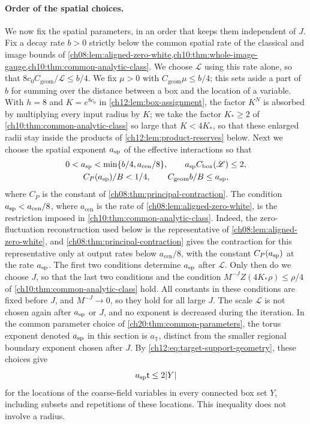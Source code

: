 \paragraph{Order of the spatial choices.}
We now fix the spatial parameters, in an order that keeps them independent of $J$. Fix a decay rate $b>0$ strictly below the common spatial rate of the classical and image bounds of \cref{ch08:lem:aligned-zero-white,ch10:thm:whole-image-gauge,ch10:thm:common-analytic-class}. We choose $\mathscr L$ using this rate alone, so that $8c_0C_{\mathrm{geom}}/\mathscr L\le b/4$. We fix $\mu>0$ with $C_{\mathrm{geom}}\mu\le b/4$; this sets aside a part of $b$ for summing over the distance between a box and the location of a variable. With $h=8$ and $K=e^{8c_0}$ in \cref{ch12:lem:box-assignment}, the factor $K^N$ is absorbed by multiplying every input radius by $K$; we take the factor $K_*\ge2$ of \cref{ch10:thm:common-analytic-class} so large that $K<4K_*$, so that these enlarged radii stay inside the products of \cref{ch12:lem:product-reserves} below. Next we choose the spatial exponent $a_{\mathrm{sp}}$ of the effective interactions so that
\begin{equation}\label{ch12:eq:pre-J-spatial-gates}
 \begin{gathered}
 0<a_{\mathrm{sp}}<\min\{b/4,a_{\mathrm{cen}}/8\},\qquad
 a_{\mathrm{sp}} C_{\mathrm{box}}(\mathscr L)\le2,\\
 C_P(a_{\mathrm{sp}})/B<1/4,\qquad
 C_{\mathrm{geom}}b/B\le a_{\mathrm{sp}} ,
 \end{gathered}
\end{equation}
where $C_P$ is the constant of \cref{ch08:thm:principal-contraction}. The condition $a_{\mathrm{sp}}<a_{\mathrm{cen}}/8$, where $a_{\mathrm{cen}}$ is the rate of \cref{ch08:lem:aligned-zero-white}, is the restriction imposed in \cref{ch10:thm:common-analytic-class}. Indeed, the zero-fluctuation reconstruction used below is the representative of \cref{ch08:lem:aligned-zero-white}, and \cref{ch08:thm:principal-contraction} gives the contraction for this representative only at output rates below $a_{\mathrm{cen}}/8$, with the constant $C_P(a_{\mathrm{sp}})$ at the rate $a_{\mathrm{sp}}$. The first two conditions determine $a_{\mathrm{sp}}$ after $\mathscr L$. Only then do we choose $J$, so that the last two conditions and the condition $M^{-J}Z(4K_*\rho)\le\rho/4$ of \cref{ch10:thm:common-analytic-class} hold. All constants in these conditions are fixed before $J$, and $M^{-J}\to0$, so they hold for all large $J$. The scale $\mathscr L$ is not chosen again after $a_{\mathrm{sp}}$ or $J$, and no exponent is decreased during the iteration. In the common parameter choice of \cref{ch20:thm:common-parameters}, the torus exponent denoted $a_{\mathrm{sp}}$ in this section is $a_{\mathbb T}$, distinct from the smaller regional boundary exponent chosen after $J$. By \eqref{ch12:eq:target-support-geometry}, these choices give
\[
 a_{\mathrm{sp}}\mathsf t\le2\lvert Y\rvert
\]
for the locations of the coarse-field variables in every connected box set $Y$, including subsets and repetitions of these locations. This inequality does not involve a radius.

